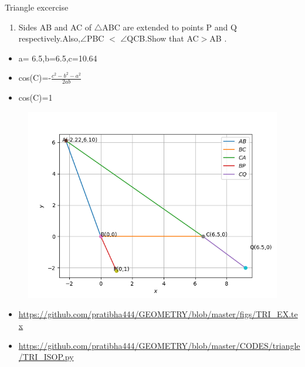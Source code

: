 \begin{frame}{Triangle excercise}
\begin{enumerate}
\item Sides AB and AC of $\triangle$ABC are extended to points P and Q respectively.Also,$\angle$PBC $<$ $\angle$QCB.Show that AC$>$AB .
\begin{center}

\end{center}
\end{enumerate}
\end{frame}
\begin{frame}
\begin{itemize}
\item a= 6.5,b=6.5,c=10.64
\item cos(C)=-$\frac{c^2 - b^2 -a^2}{2ab}$
\item cos(C)=1

\seti
\end{itemize}
\end{frame}
\begin{frame}
\begin{center}
\begin{figure}
\includegraphics[scale=.4]{./CODES/triangle/NEWTRI.png}
\end{figure}
\end{center}
\begin{itemize}
\item \url{https://github.com/pratibha444/GEOMETRY/blob/master/figs/TRI_EX.tex}
\item \url{https://github.com/pratibha444/GEOMETRY/blob/master/CODES/triangle/TRI_ISOP.py}
\end{itemize}
\end{frame}



